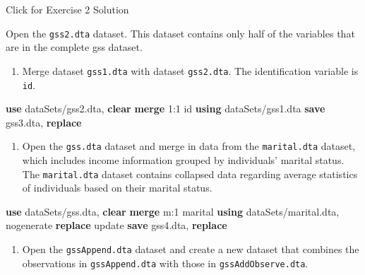 \documentclass[
]{book}
\newenvironment{Shaded}{\begin{snugshade}}{\end{snugshade}}
\newcommand{\FunctionTok}[1]{\textcolor[rgb]{0.00,0.00,0.00}{#1}}
\newcommand{\KeywordTok}[1]{\textcolor[rgb]{0.13,0.29,0.53}{\textbf{#1}}}
\newcommand{\NormalTok}[1]{#1}
\providecommand{\tightlist}{%
  \setlength{\itemsep}{0pt}\setlength{\parskip}{0pt}}
\begin{document}
{Click for Exercise 2 Solution}

\begin{alert}

Open the \texttt{gss2.dta} dataset. This dataset contains only half of the variables that are in the complete gss dataset.

\begin{enumerate}
\def\labelenumi{\arabic{enumi}.}
\tightlist
\item
  Merge dataset \texttt{gss1.dta} with dataset \texttt{gss2.dta}. The identification variable is \texttt{id}.
\end{enumerate}

\begin{Shaded}
\begin{Highlighting}[]
\KeywordTok{use}\NormalTok{ dataSets/gss2.dta, }\KeywordTok{clear}
\KeywordTok{merge}\NormalTok{ 1:1 id }\KeywordTok{using}\NormalTok{ dataSets/gss1.dta}
\KeywordTok{save}\NormalTok{ gss3.dta, }\KeywordTok{replace}
\end{Highlighting}
\end{Shaded}

\begin{enumerate}
\def\labelenumi{\arabic{enumi}.}
\setcounter{enumi}{1}
\tightlist
\item
  Open the \texttt{gss.dta} dataset and merge in data from the \texttt{marital.dta} dataset, which includes income information grouped by individuals' marital status. The \texttt{marital.dta} dataset contains collapsed data regarding average statistics of individuals based on their marital status.
\end{enumerate}

\begin{Shaded}
\begin{Highlighting}[]
\KeywordTok{use}\NormalTok{ dataSets/gss.dta, }\KeywordTok{clear}
\KeywordTok{merge} \FunctionTok{m}\NormalTok{:1 marital }\KeywordTok{using}\NormalTok{ dataSets/marital.dta, nogenerate }\KeywordTok{replace}\NormalTok{ update}
\KeywordTok{save}\NormalTok{ gss4.dta, }\KeywordTok{replace}
\end{Highlighting}
\end{Shaded}

\begin{enumerate}
\def\labelenumi{\arabic{enumi}.}
\setcounter{enumi}{2}
\tightlist
\item
  Open the \texttt{gssAppend.dta} dataset and create a new dataset that combines the observations in \texttt{gssAppend.dta} with those in \texttt{gssAddObserve.dta}.
\end{enumerate}


\end{alert}
\end{document}
